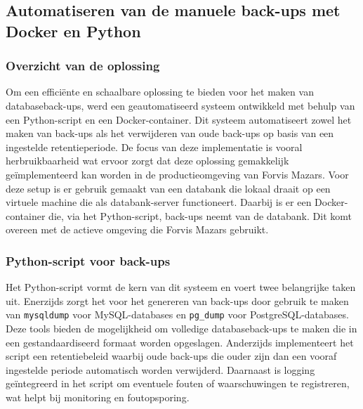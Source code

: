 \subsection{Automatiseren van de manuele back-ups met Docker en Python}
\subsubsection{Overzicht van de oplossing}
Om een efficiënte en schaalbare oplossing te bieden voor het maken van databaseback-ups, werd een geautomatiseerd systeem ontwikkeld met behulp van een Python-script en een Docker-container. Dit systeem automatiseert zowel het maken van back-ups als het verwijderen van oude back-ups op basis van een ingestelde retentieperiode. De focus van deze implementatie is vooral herbruikbaarheid wat ervoor zorgt dat deze oplossing gemakkelijk geïmplementeerd kan worden in de productieomgeving van Forvis Mazars. Voor deze setup is er gebruik gemaakt van een databank die lokaal draait op een virtuele machine die als databank-server functioneert. Daarbij is er een Docker-container die, via het Python-script, back-ups neemt van de databank. Dit komt overeen met de actieve omgeving die Forvis Mazars gebruikt.

\subsubsection{Python-script voor back-ups}
Het Python-script vormt de kern van dit systeem en voert twee belangrijke taken uit. Enerzijds zorgt het voor het genereren van back-ups door gebruik te maken van \texttt{mysqldump} voor MySQL-databases en \texttt{pg\_dump} voor PostgreSQL-databases. Deze tools bieden de mogelijkheid om volledige databaseback-ups te maken die in een gestandaardiseerd formaat worden opgeslagen. Anderzijds implementeert het script een retentiebeleid waarbij oude back-ups die ouder zijn dan een vooraf ingestelde periode automatisch worden verwijderd. Daarnaast is logging geïntegreerd in het script om eventuele fouten of waarschuwingen te registreren, wat helpt bij monitoring en foutopsporing.

